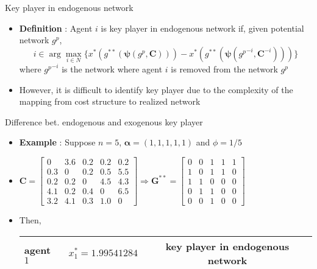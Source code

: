 \documentclass[10pt,dvipdfmx]{beamer}
\begin{document}
\begin{frame}{Key player in endogenous network}
\begin{itemize}
    \item {\bf{Definition}} : Agent $i$ is key player in endogenous network if, given potential network $g^p$,
        \[ i \in \arg \max_{i \in N} \{ x^*(g^{**}(\bm{\psi}({g^p}, \bm{C}))) - x^*(g^{**}(\bm{\psi}({g^p}^{-i}, \bm{C}^{-i}))) \} \]
        where ${g^p}^{-i}$ is the network where agent $i$ is removed from the network $g^p$
    \item However, it is difficult to identify key player due to the complexity of the mapping from cost structure to realized network
\end{itemize}
\end{frame}

\begin{frame}{Difference bet. endogenous and exogenous key player}
\begin{itemize}
    \item {\bf{Example}} : Suppose $n=5$, $\bm{\alpha} = (1, 1, 1, 1, 1)$ and $\phi = 1/5$
    \item $\bm{C} = \left[
            \begin{array}{ccccc}
                0 & 3.6 & 0.2 & 0.2 & 0.2 \\
                0.3 & 0 & 0.2 & 0.5 & 5.5 \\
                0.2 & 0.2 & 0 & 4.5 & 4.3 \\
                4.1 & 0.2 & 0.4 & 0 & 6.5 \\
                3.2 & 4.1 & 0.3 & 1.0 & 0
            \end{array} \right] \Rightarrow \bm{G}^{**} = \left[
            \begin{array}{ccccc}
                0 & 0 & 1 & 1 & 1 \\
                1 & 0 & 1 & 1 & 0 \\
                1 & 1 & 0 & 0 & 0 \\
                0 & 1 & 1 & 0 & 0 \\
                0 & 0 & 1 & 0 & 0
            \end{array} \right]$
    \item Then,
        \begin{table}[htb]
          \begin{center}
            \begin{tabular}{|l|l|c|} \hline
              agent $1$ & $x_1^* = 1.99541284$ & key player in endogenous network \\ \hline

\end{tabular}
\end{center}
\end{table}
\end{itemize}
\end{frame}
\end{document}
